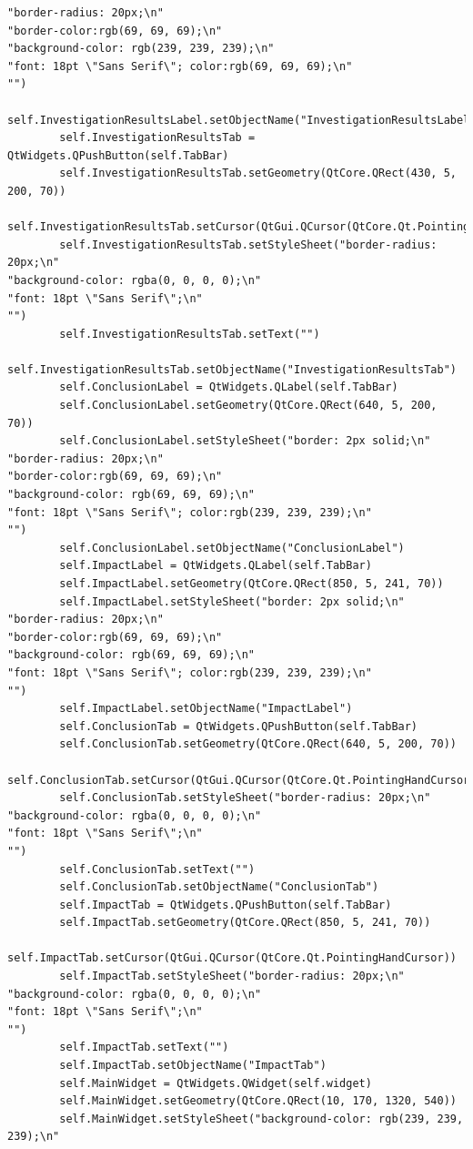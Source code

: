 \documentclass[12pt]{article}
\begin{document}
\begin{lstlisting}
"border-radius: 20px;\n"
"border-color:rgb(69, 69, 69);\n"
"background-color: rgb(239, 239, 239);\n"
"font: 18pt \"Sans Serif\"; color:rgb(69, 69, 69);\n"
"")
        self.InvestigationResultsLabel.setObjectName("InvestigationResultsLabel")
        self.InvestigationResultsTab = QtWidgets.QPushButton(self.TabBar)
        self.InvestigationResultsTab.setGeometry(QtCore.QRect(430, 5, 200, 70))
        self.InvestigationResultsTab.setCursor(QtGui.QCursor(QtCore.Qt.PointingHandCursor))
        self.InvestigationResultsTab.setStyleSheet("border-radius: 20px;\n"
"background-color: rgba(0, 0, 0, 0);\n"
"font: 18pt \"Sans Serif\";\n"
"")
        self.InvestigationResultsTab.setText("")
        self.InvestigationResultsTab.setObjectName("InvestigationResultsTab")
        self.ConclusionLabel = QtWidgets.QLabel(self.TabBar)
        self.ConclusionLabel.setGeometry(QtCore.QRect(640, 5, 200, 70))
        self.ConclusionLabel.setStyleSheet("border: 2px solid;\n"
"border-radius: 20px;\n"
"border-color:rgb(69, 69, 69);\n"
"background-color: rgb(69, 69, 69);\n"
"font: 18pt \"Sans Serif\"; color:rgb(239, 239, 239);\n"
"")
        self.ConclusionLabel.setObjectName("ConclusionLabel")
        self.ImpactLabel = QtWidgets.QLabel(self.TabBar)
        self.ImpactLabel.setGeometry(QtCore.QRect(850, 5, 241, 70))
        self.ImpactLabel.setStyleSheet("border: 2px solid;\n"
"border-radius: 20px;\n"
"border-color:rgb(69, 69, 69);\n"
"background-color: rgb(69, 69, 69);\n"
"font: 18pt \"Sans Serif\"; color:rgb(239, 239, 239);\n"
"")
        self.ImpactLabel.setObjectName("ImpactLabel")
        self.ConclusionTab = QtWidgets.QPushButton(self.TabBar)
        self.ConclusionTab.setGeometry(QtCore.QRect(640, 5, 200, 70))
        self.ConclusionTab.setCursor(QtGui.QCursor(QtCore.Qt.PointingHandCursor))
        self.ConclusionTab.setStyleSheet("border-radius: 20px;\n"
"background-color: rgba(0, 0, 0, 0);\n"
"font: 18pt \"Sans Serif\";\n"
"")
        self.ConclusionTab.setText("")
        self.ConclusionTab.setObjectName("ConclusionTab")
        self.ImpactTab = QtWidgets.QPushButton(self.TabBar)
        self.ImpactTab.setGeometry(QtCore.QRect(850, 5, 241, 70))
        self.ImpactTab.setCursor(QtGui.QCursor(QtCore.Qt.PointingHandCursor))
        self.ImpactTab.setStyleSheet("border-radius: 20px;\n"
"background-color: rgba(0, 0, 0, 0);\n"
"font: 18pt \"Sans Serif\";\n"
"")
        self.ImpactTab.setText("")
        self.ImpactTab.setObjectName("ImpactTab")
        self.MainWidget = QtWidgets.QWidget(self.widget)
        self.MainWidget.setGeometry(QtCore.QRect(10, 170, 1320, 540))
        self.MainWidget.setStyleSheet("background-color: rgb(239, 239, 239);\n"

\end{lstlisting}
\end{document}
